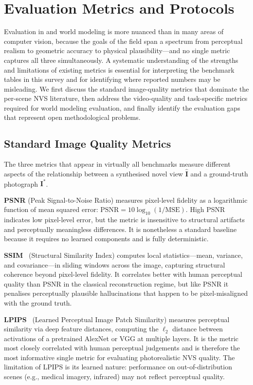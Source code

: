 \section{Evaluation Metrics and Protocols}
\label{sec:eval}

Evaluation in \nvs{} and world modeling is more nuanced than in many areas
of computer vision, because the goals of the field span a spectrum from
perceptual realism to geometric accuracy to physical plausibility---and
no single metric captures all three simultaneously.
A systematic understanding of the strengths and limitations of existing
metrics is essential for interpreting the benchmark tables in this survey
and for identifying where reported numbers may be misleading.
We first discuss the standard image-quality metrics that dominate the per-scene
NVS literature, then address the video-quality and task-specific metrics
required for world modeling evaluation, and finally identify the evaluation
gaps that represent open methodological problems.

\subsection{Standard Image Quality Metrics}

The three metrics that appear in virtually all \nvs{} benchmarks measure
different aspects of the relationship between a synthesised novel view
$\hat{\mathbf{I}}$ and a ground-truth photograph $\mathbf{I}^*$.

\textbf{PSNR} (Peak Signal-to-Noise Ratio) measures pixel-level fidelity
as a logarithmic function of mean squared error: $\text{PSNR}=10\log_{10}(1/\text{MSE})$.
High PSNR indicates low pixel-level error, but the metric is insensitive to
structural artifacts and perceptually meaningless differences.
It is nonetheless a standard baseline because it requires no learned components
and is fully deterministic.

\textbf{SSIM}~\citep{wang2004ssim} (Structural Similarity Index) computes local
statistics---mean, variance, and covariance---in sliding windows across the image,
capturing structural coherence beyond pixel-level fidelity.
It correlates better with human perceptual quality than PSNR in the classical
reconstruction regime, but like PSNR it penalises perceptually plausible
hallucinations that happen to be pixel-misaligned with the ground truth.

\textbf{LPIPS}~\citep{zhang2018lpips} (Learned Perceptual Image Patch Similarity)
measures perceptual similarity via deep feature distances, computing the $\ell_2$
distance between activations of a pretrained AlexNet or VGG at multiple layers.
It is the metric most closely correlated with human perceptual judgements and
is therefore the most informative single metric for evaluating photorealistic
NVS quality.
The limitation of LPIPS is its learned nature: performance on out-of-distribution
scenes (e.g., medical imagery, infrared) may not reflect perceptual quality.

